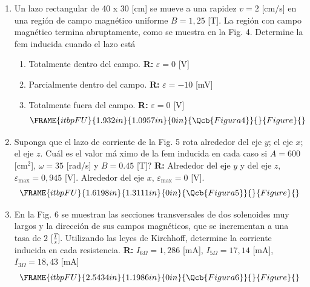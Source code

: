 \documentclass[12pt]{article}
\begin{document}
\begin{enumerate}
\item Un lazo rectangular de 40 x 30 [cm] se mueve a una rapidez $v=2$
[cm/s] en una regi\'{o}n de campo magn\'{e}tico uniforme $B=1,25$ [T]. La
regi\'{o}n con campo magn\'{e}tico termina abruptamente, como se muestra en
la Fig. 4. Determine la fem inducida cuando el lazo est\'{a}

\begin{enumerate}
\item Totalmente dentro del campo. \textbf{R: }$\varepsilon =0$ [V]

\item Parcialmente dentro del campo. \textbf{R: }$\varepsilon =-10$ [mV]

\item Totalmente fuera del campo. \textbf{R:} $\varepsilon =0$ [V]%
\begin{equation*}
\FRAME{itbpFU}{1.932in}{1.0957in}{0in}{\Qcb{Figura 4}}{}{Figure}{\special%
{language "Scientific Word";type "GRAPHIC";maintain-aspect-ratio
TRUE;display "USEDEF";valid_file "T";width 1.932in;height 1.0957in;depth
0in;original-width 4.6501in;original-height 2.6247in;cropleft "0";croptop
"1";cropright "1";cropbottom "0";tempfilename
'R45S6604.wmf';tempfile-properties "XPR";}}
\end{equation*}
\end{enumerate}

\item Suponga que el lazo de corriente de la Fig. 5 rota alrededor del eje $%
y $; el eje $x$; el eje $z$. \textquestiondown Cu\'{a}l es el valor m\'{a}%
ximo de la fem inducida en cada caso si $A=600$ [cm$^{2}$], $\omega =35$
[rad/s] y $B=0.45$ [T]? \textbf{R: }Alrededor del eje $y$ y del eje $z,$ $%
\varepsilon _{\max }=0,945$ [V]. Alrededor del eje $x$, $\varepsilon _{\max
}=0$ [V].%
\begin{equation*}
\FRAME{itbpFU}{1.6198in}{1.3111in}{0in}{\Qcb{Figura 5}}{}{Figure}{\special%
{language "Scientific Word";type "GRAPHIC";maintain-aspect-ratio
TRUE;display "USEDEF";valid_file "T";width 1.6198in;height 1.3111in;depth
0in;original-width 3.0952in;original-height 2.5002in;cropleft "0";croptop
"1";cropright "1";cropbottom "0";tempfilename
'R45S6605.wmf';tempfile-properties "XPR";}}
\end{equation*}

\item En la Fig. 6 se muestran las secciones transversales de dos solenoides
muy largos y la direcci\'{o}n de sus campos magn\'{e}ticos, que se
incrementan a una tasa de $2$ [$\frac{T}{s}]$. Utilizando las leyes de
Kirchhoff, determine la corriente inducida en cada resistencia. \textbf{R: }$%
I_{6\Omega }=1,286$ [mA], $I_{5\Omega }=17,14$ [mA], $I_{3\Omega }=18,43$
[mA]%
\begin{equation*}
\FRAME{itbpFU}{2.5434in}{1.1986in}{0in}{\Qcb{Figura 6}}{}{Figure}{\special%
{language "Scientific Word";type "GRAPHIC";maintain-aspect-ratio
TRUE;display "USEDEF";valid_file "T";width 2.5434in;height 1.1986in;depth
0in;original-width 5.9828in;original-height 2.8055in;cropleft "0";croptop
"1";cropright "1";cropbottom "0";tempfilename
'R45S6606.wmf';tempfile-properties "XPR";}}
\end{equation*}


\end{enumerate}
\end{document}
